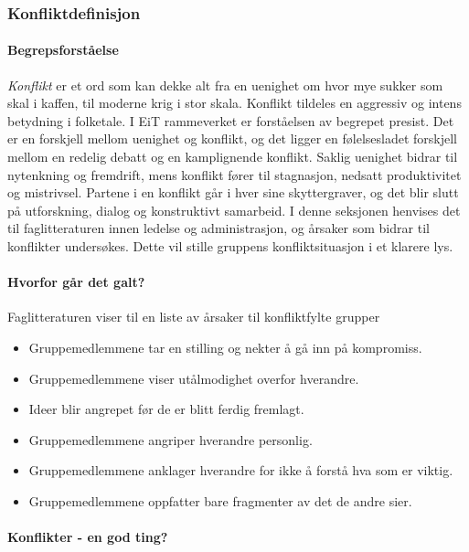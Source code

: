 \subsubsection{Konfliktdefinisjon}

\paragraph{Begrepsforståelse}
\emph{Konflikt} er et ord som kan dekke alt fra en uenighet om hvor mye sukker som skal i kaffen, til moderne krig i stor skala. 
Konflikt tildeles en aggressiv og intens betydning i folketale. I EiT rammeverket er forståelsen av begrepet presist. Det er en forskjell mellom uenighet og konflikt, og det ligger en følelsesladet forskjell mellom en redelig debatt og en kamplignende konflikt. Saklig uenighet bidrar til nytenkning og fremdrift, mens konflikt fører til stagnasjon, nedsatt produktivitet og mistrivsel\cite{ledernytt}. Partene i en konflikt går i hver sine skyttergraver, og det blir slutt på utforskning, dialog og konstruktivt samarbeid. I denne seksjonen henvises det til faglitteraturen innen ledelse og administrasjon, og årsaker som bidrar til konflikter undersøkes. Dette vil stille gruppens konfliktsituasjon i et klarere lys. 

\paragraph{Hvorfor går det galt?}

Faglitteraturen viser til en liste av årsaker til konfliktfylte grupper\cite[p.~253]{orgorg}

\begin{itemize}

  \item Gruppemedlemmene tar en stilling og nekter å gå inn på kompromiss.
  \item Gruppemedlemmene viser utålmodighet overfor hverandre.  
  \item Ideer blir angrepet før de er blitt ferdig fremlagt.
  \item Gruppemedlemmene angriper hverandre personlig.
  \item Gruppemedlemmene anklager hverandre for ikke å forstå hva som er viktig.
  \item Gruppemedlemmene oppfatter bare fragmenter av det de andre sier.  
\end{itemize}

\paragraph{Konflikter - en god ting?}

